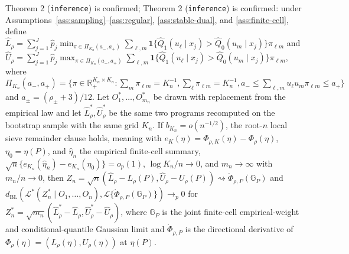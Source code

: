 \documentclass[11pt]{article}
\newcommand{\one}{\mathbf{1}}
\theoremstyle{definition}
\theoremstyle{plain}
\theoremstyle{remark}
\begin{document}
Theorem 2 (\texttt{inference}) is confirmed; Theorem 2 (\texttt{inference}) is confirmed: under Assumptions~\ref{ass:sampling}--\ref{ass:regular}, \ref{ass:stable-dual}, and \ref{ass:finite-cell}, define \(\widehat L_\rho=\sum_{j=1}^J\widehat p_j\min_{\pi\in\Pi_{K_n}(a_-,a_+)}\sum_{\ell,m}\one\{\widehat Q_1(u_\ell\mid x_j)>\widehat Q_0(u_m\mid x_j)\}\pi_{\ell m}\) and \(\widehat U_\rho=\sum_{j=1}^J\widehat p_j\max_{\pi\in\Pi_{K_n}(a_-,a_+)}\sum_{\ell,m}\one\{\widehat Q_1(u_\ell\mid x_j)>\widehat Q_0(u_m\mid x_j)\}\pi_{\ell m}\), where \(\Pi_{K_n}(a_-,a_+)=\{\pi\in\mathbb R_+^{K_n\times K_n}:\sum_m\pi_{\ell m}=K_n^{-1},\sum_\ell\pi_{\ell m}=K_n^{-1},a_-\le\sum_{\ell,m}u_\ell u_m\pi_{\ell m}\le a_+\}\) and \(a_\pm=(\rho_\pm+3)/12\). Let \(O_1^*,\ldots,O_{m_n}^*\) be drawn with replacement from the empirical law and let \(\widehat L_\rho^*,\widehat U_\rho^*\) be the same two programs recomputed on the bootstrap sample with the same grid \(K_n\). If \(b_{K_n}=o(n^{-1/2})\), the root-\(n\) local sieve remainder clause holds, meaning with \(e_K(\eta)=\Phi_{\rho,K}(\eta)-\Phi_\rho(\eta)\), \(\eta_0=\eta(P)\), and \(\widehat\eta_n\) the empirical finite-cell summary, \(\sqrt n\{e_{K_n}(\widehat\eta_n)-e_{K_n}(\eta_0)\}=o_p(1)\), \(\log K_n/n\to0\), and \(m_n\to\infty\) with \(m_n/n\to0\), then \(Z_n=\sqrt n(\widehat L_\rho-L_\rho(P),\widehat U_\rho-U_\rho(P))\rightsquigarrow\dot\Phi_{\rho,P}(\mathbb G_P)\) and \(d_{\mathrm{BL}}(\mathcal L^*(Z_n^*\mid O_1,\ldots,O_n),\mathcal L\{\dot\Phi_{\rho,P}(\mathbb G_P)\})\to_p0\) for \(Z_n^*=\sqrt{m_n}(\widehat L_\rho^*-\widehat L_\rho,\widehat U_\rho^*-\widehat U_\rho)\), where \(\mathbb G_P\) is the joint finite-cell empirical-weight and conditional-quantile Gaussian limit and \(\dot\Phi_{\rho,P}\) is the directional derivative of \(\Phi_\rho(\eta)=(L_\rho(\eta),U_\rho(\eta))\) at \(\eta(P)\).
\end{document}
